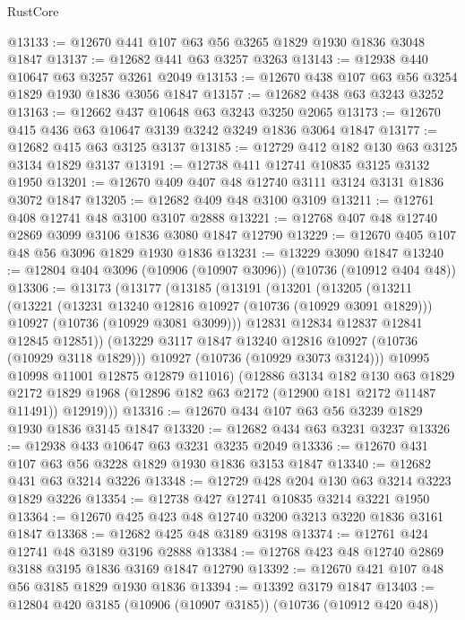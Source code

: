 \begin{lexlean}{RustCore}
\begin{coremodule}
@13133 := @12670 @441 @107 @63 @56 @3265 @1829 @1930 @1836 @3048 @1847
@13137 := @12682 @441 @63 @3257 @3263
@13143 := @12938 @440 @10647 @63 @3257 @3261 @2049
@13153 := @12670 @438 @107 @63 @56 @3254 @1829 @1930 @1836 @3056 @1847
@13157 := @12682 @438 @63 @3243 @3252
@13163 := @12662 @437 @10648 @63 @3243 @3250 @2065
@13173 := @12670 @415 @436 @63 @10647 @3139 @3242 @3249 @1836 @3064 @1847
@13177 := @12682 @415 @63 @3125 @3137
@13185 := @12729 @412 @182 @130 @63 @3125 @3134 @1829 @3137
@13191 := @12738 @411 @12741 @10835 @3125 @3132 @1950
@13201 := @12670 @409 @407 @48 @12740 @3111 @3124 @3131 @1836 @3072 @1847
@13205 := @12682 @409 @48 @3100 @3109
@13211 := @12761 @408 @12741 @48 @3100 @3107 @2888
@13221 := @12768 @407 @48 @12740 @2869 @3099 @3106 @1836 @3080 @1847 @12790
@13229 := @12670 @405 @107 @48 @56 @3096 @1829 @1930 @1836
@13231 := @13229 @3090 @1847
@13240 := @12804 @404 @3096 (@10906 (@10907 @3096)) (@10736 (@10912 @404 @48))
@13306 := @13173
    (@13177
      (@13185
        (@13191
          (@13201
            (@13205
              (@13211
                (@13221
                  (@13231 @13240 @12816 @10927 (@10736 (@10929 @3091 @1829)))
                  @10927
                  (@10736 (@10929 @3081 @3099)))
                @12831
                @12834
                @12837
                @12841
                @12845
                @12851))
            (@13229 @3117 @1847 @13240 @12816 @10927 (@10736 (@10929 @3118 @1829)))
            @10927
            (@10736 (@10929 @3073 @3124)))
          @10995
          @10998
          @11001
          @12875
          @12879
          @11016)
        (@12886
          @3134
          @182
          @130
          @63
          @1829
          @2172
          @1829
          @1968
          (@12896 @182 @63 @2172 (@12900 @181 @2172 @11487 @11491))
          @12919)))
@13316 := @12670 @434 @107 @63 @56 @3239 @1829 @1930 @1836 @3145 @1847
@13320 := @12682 @434 @63 @3231 @3237
@13326 := @12938 @433 @10647 @63 @3231 @3235 @2049
@13336 := @12670 @431 @107 @63 @56 @3228 @1829 @1930 @1836 @3153 @1847
@13340 := @12682 @431 @63 @3214 @3226
@13348 := @12729 @428 @204 @130 @63 @3214 @3223 @1829 @3226
@13354 := @12738 @427 @12741 @10835 @3214 @3221 @1950
@13364 := @12670 @425 @423 @48 @12740 @3200 @3213 @3220 @1836 @3161 @1847
@13368 := @12682 @425 @48 @3189 @3198
@13374 := @12761 @424 @12741 @48 @3189 @3196 @2888
@13384 := @12768 @423 @48 @12740 @2869 @3188 @3195 @1836 @3169 @1847 @12790
@13392 := @12670 @421 @107 @48 @56 @3185 @1829 @1930 @1836
@13394 := @13392 @3179 @1847
@13403 := @12804 @420 @3185 (@10906 (@10907 @3185)) (@10736 (@10912 @420 @48))

\end{coremodule}
\end{lexlean}

